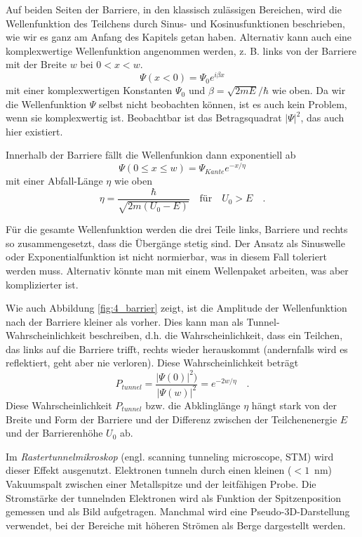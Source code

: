 Auf beiden Seiten der Barriere, in den klassisch zulässigen Bereichen, wird die Wellenfunktion des Teilchens durch Sinus- und Kosinusfunktionen beschrieben, wie wir es ganz am Anfang des Kapitels getan haben. Alternativ kann auch eine komplexwertige Wellenfunktion angenommen werden, z. B. links von der Barriere mit der Breite $w$ bei $0 < x < w$.
\begin{equation}
    \Psi(x < 0) = \Psi_0 e^{i \beta x}
\end{equation}
mit einer komplexwertigen Konstanten $\Psi_0$  und $\beta = \sqrt{2 m E }/ \hbar$ wie oben. Da wir die Wellenfunktion $\Psi$ selbst nicht beobachten können, ist es auch kein Problem, wenn sie komplexwertig ist. Beobachtbar ist das Betragsquadrat $|\Psi|^2$, das auch hier existiert.

Innerhalb der Barriere fällt die Wellenfunkion dann exponentiell ab
\begin{equation}
    \Psi(0 \le x \le w) = \Psi_{Kante} e^{- x / \eta}
\end{equation}
mit einer Abfall-Länge $\eta$ wie oben 
\begin{equation}
    \eta = \frac{\hbar}{\sqrt{2m ( U_0 - E)}} \quad \text{für} \quad U_0 > E \quad .
\end{equation}

Für die gesamte Wellenfunktion werden die drei Teile links, Barriere und rechts so zusammengesetzt, dass die Übergänge stetig sind.  Der Ansatz als Sinuswelle oder Exponentialfunktion ist nicht normierbar, was in diesem Fall toleriert werden muss. Alternativ könnte man mit einem Wellenpaket arbeiten, was aber komplizierter ist.

Wie auch Abbildung \ref{fig:4_barrier} zeigt, ist die Amplitude der Wellenfunktion nach der Barriere kleiner als vorher. Dies kann man als Tunnel-Wahrscheinlichkeit beschreiben, d.h. die Wahrscheinlichkeit, dass ein Teilchen, das links auf die Barriere trifft, rechts wieder herauskommt (andernfalls wird es reflektiert, geht aber nie verloren). Diese Wahrscheinlichkeit beträgt
\begin{equation}
    P_{tunnel} = \frac{|\Psi(0)|^2)} {|\Psi(w)|^2} = e^{-2 w / \eta} \quad .
\end{equation}
Diese Wahrscheinlichkeit $P_{tunnel}$ bzw. die Abklinglänge $\eta$ hängt stark von der Breite und Form der Barriere und der Differenz zwischen der Teilchenenergie $E$ und der Barrierenhöhe $U_0$ ab.

Im \emph{Rastertunnelmikroskop} (engl. scanning tunneling microscope, STM) wird dieser Effekt ausgenutzt. Elektronen tunneln durch einen kleinen ($< 1$~nm) Vakuumspalt zwischen einer Metallspitze und der leitfähigen Probe. Die Stromstärke der tunnelnden Elektronen wird als Funktion der Spitzenposition gemessen und als Bild aufgetragen. Manchmal wird eine Pseudo-3D-Darstellung verwendet, bei der Bereiche mit höheren Strömen als Berge dargestellt werden.



